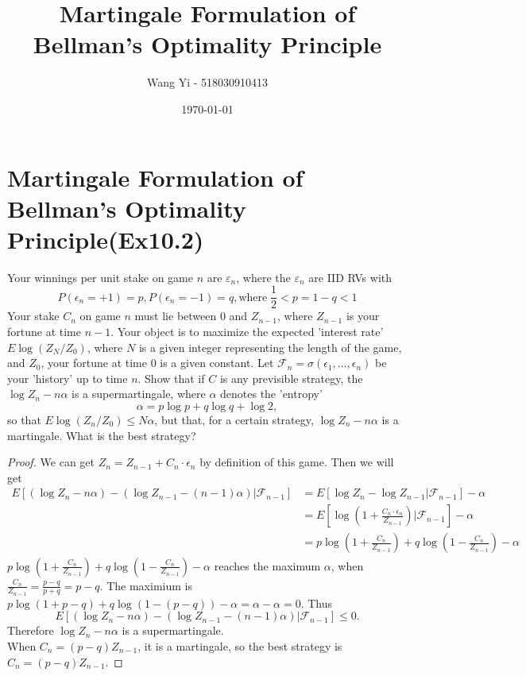 \documentclass[11pt,a4paper,oneside]{article}
\renewcommand{\hwtitle} {Martingale Formulation of Bellman's Optimality Principle}
\renewcommand{\hwauthor}{Wang Yi - 518030910413}
\renewcommand{\hwdate}{\today}
\begin{document}
\title{\hwtitle}
\author{\hwauthor}
\date{\hwdate}
\maketitle

\section*{Martingale Formulation of Bellman's Optimality Principle(Ex10.2)}
\begin{problem}{1}
	\statement
    Your winnings per unit stake on game $n$ are $\varepsilon_n$, where the $\varepsilon_n$ are IID RVs with 
    \[
        P(\epsilon_n = +1) = p,P(\epsilon_n = -1) = q, \textrm{where} \; \frac{1}{2} < p = 1 - q < 1
    \]
    Your stake $C_n$ on game $n$ must lie between $0$ and $Z_{n-1}$, where $Z_{n-1}$ is your fortune at time $n - 1$. Your object is to maximize the expected 'interest rate' $E\log (Z_N/Z_0)$, where $N$ is a given integer representing the length of the game, and $Z_0$, your fortune at time $0$ is a given constant. Let $\mathcal{F}_n = \sigma(\epsilon_1, \dots, \epsilon_n)$ be your 'history' up to time $n$. Show that if $C$ is any previsible strategy, the $\log Z_n - n\alpha$ is a supermartingale, where $\alpha$ denotes the 'entropy'
    \[
        \alpha = p \log p + q \log q + \log 2,
    \]
    so that $E\log (Z_n/Z_0) \leq N\alpha$, but that, for a certain strategy, $\log Z_n - n\alpha$ is a martingale. What is the best strategy?
    \solution
    \begin{proof}
        We can get $Z_n = Z_{n-1} + C_n \cdot \epsilon_n$ by definition of this game. Then we will get
        \[
            \begin{split}
            E[(\log Z_n - n\alpha) - (\log Z_{n-1} - (n - 1)\alpha)| \mathcal{F}_{n-1}] &= E[\log Z_n - \log Z_{n-1}| \mathcal{F}_{n-1}] - \alpha\\
            &= E[\log (1 + \frac{C_n \cdot \epsilon_n}{Z_{n-1}})| \mathcal{F}_{n-1}] - \alpha \\
            &= p\log (1 + \frac{C_n }{Z_{n-1}}) + q\log (1 - \frac{C_n }{Z_{n-1}}) - \alpha
            \end{split}
        \]
    $p\log (1 + \frac{C_n }{Z_{n-1}}) + q\log (1 - \frac{C_n }{Z_{n-1}}) - \alpha$ reaches the maximum $\alpha$, when $\frac{C_n }{Z_{n-1}} = \frac{p-q}{p + q} = p - q$. The maximium is $p\log (1 + p - q) + q\log (1 - (p - q)) - \alpha = \alpha - \alpha = 0$. Thus
    \[
        E[(\log Z_n - n\alpha) - (\log Z_{n-1} - (n - 1)\alpha)| \mathcal{F}_{n-1}] \leq 0.
    \]
    Therefore $\log Z_n - n\alpha$ is a supermartingale.\\
    When $C_n = (p - q)Z_{n - 1}$, it is a martingale, so the best strategy is $C_n = (p - q)Z_{n - 1}$.
    \end{proof}
\end{problem}
\end{document}
